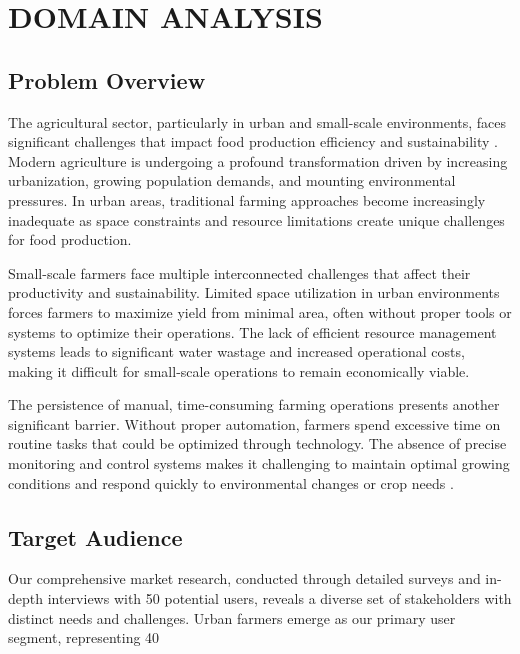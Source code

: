 \chapter{DOMAIN ANALYSIS}

\section{Problem Overview}
The agricultural sector, particularly in urban and small-scale environments, faces significant challenges that impact food production efficiency and sustainability \cite{agtech2023}. Modern agriculture is undergoing a profound transformation driven by increasing urbanization, growing population demands, and mounting environmental pressures. In urban areas, traditional farming approaches become increasingly inadequate as space constraints and resource limitations create unique challenges for food production.

Small-scale farmers face multiple interconnected challenges that affect their productivity and sustainability. Limited space utilization in urban environments forces farmers to maximize yield from minimal area, often without proper tools or systems to optimize their operations. The lack of efficient resource management systems leads to significant water wastage and increased operational costs, making it difficult for small-scale operations to remain economically viable.

The persistence of manual, time-consuming farming operations presents another significant barrier. Without proper automation, farmers spend excessive time on routine tasks that could be optimized through technology. The absence of precise monitoring and control systems makes it challenging to maintain optimal growing conditions and respond quickly to environmental changes or crop needs \cite{urban_farming2022}.

\section{Target Audience}
Our comprehensive market research, conducted through detailed surveys and in-depth interviews with 50 potential users, reveals a diverse set of stakeholders with distinct needs and challenges. Urban farmers emerge as our primary user segment, representing 40%


